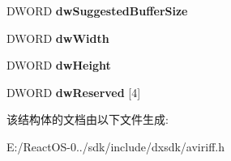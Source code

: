 \begin{DoxyCompactItemize}
\item 
\mbox{\label{struct__avimainheader_a7b3fe6bf288102d670913b7bcbcaf49f}} 
D\+W\+O\+RD {\bfseries dw\+Suggested\+Buffer\+Size}
\item 
\mbox{\label{struct__avimainheader_a51ed9bd7cf9fa71682ce64857b6613c6}} 
D\+W\+O\+RD {\bfseries dw\+Width}
\item 
\mbox{\label{struct__avimainheader_a616aabc4332fb562a52a524c9ccc2f1c}} 
D\+W\+O\+RD {\bfseries dw\+Height}
\item 
\mbox{\label{struct__avimainheader_a21340c30aa97ed3600c2f541c07ff338}} 
D\+W\+O\+RD {\bfseries dw\+Reserved} \mbox{[}4\mbox{]}
\end{DoxyCompactItemize}


该结构体的文档由以下文件生成\+:\begin{DoxyCompactItemize}
\item 
E\+:/\+React\+O\+S-\/0../sdk/include/dxsdk/aviriff.\+h\end{DoxyCompactItemize}
